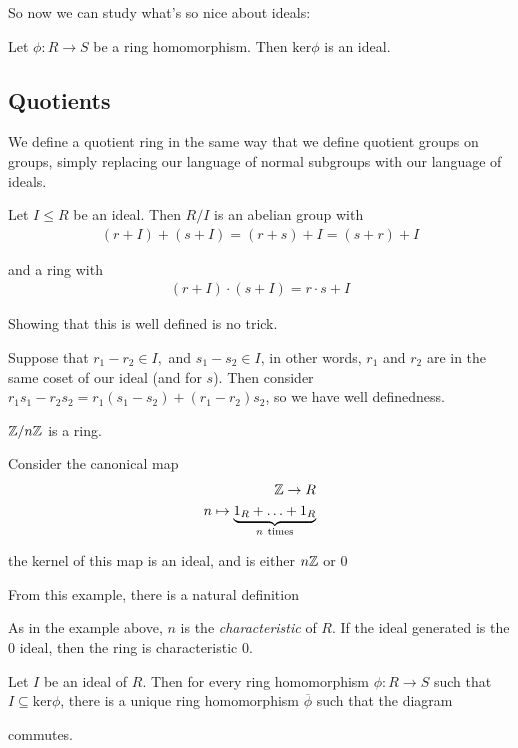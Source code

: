 \documentclass[12pt, twosided]{article}
\begin{document}
So now we can study what's so nice about ideals:

\begin{thm}
  Let \(\phi: R \to S\) be a ring homomorphism. Then \(\mathrm{ker} \phi\) is an ideal.
\end{thm}

\subsection{Quotients}

We define a quotient ring in the same way that we define quotient groups on groups, simply replacing our language of normal subgroups with our language of ideals.

\begin{df}
  Let \(I \leq R\) be an ideal. Then \(R / I\) is an abelian group with
  \begin{align*}
    (r + I) + (s + I) = (r + s) + I = (s + r) + I
  \end{align*}

  and a ring with
  \begin{align*}
    (r + I) \cdot (s + I) = r \cdot s + I
  \end{align*}
\end{df}

Showing that this is well defined is no trick.

Suppose that \(r_1 - r_2 \in I,\) and \(s_1 - s_2 \in I\), in other words, \(r_1\) and \(r_2\) are in the same coset of our ideal (and for \(s\)). Then consider \(r_1s_1 - r_2s_2 = r_1(s_1 - s_2) + (r_1 - r_2)s_2\), so we have well definedness.

\begin{exa}
  \(\mathbb{Z} / n\mathbb{Z}\) is a ring.

  Consider the canonical map
  \begin{align*}
    \mathbb{Z} \to R \\
    n \mapsto \underbrace{1_R + \ldots + 1_R}_{n\ \mathrm{times}}
  \end{align*}

  the kernel of this map is an ideal, and is either \(n\mathbb{Z}\) or 0
\end{exa}
From this example, there is a natural definition
\begin{df}
  As in the example above, \(n\) is the \textit{characteristic} of \(R\). If the ideal generated is the 0 ideal, then the ring is characteristic 0.
\end{df}

\begin{thm}
  Let \(I\) be an ideal of \(R\). Then for every ring homomorphism \(\phi: R \to S\) such that \(I \subseteq \mathrm{ker}\phi\), there is a unique ring homomorphism \(\overline{\phi}\) such that the diagram

  \begin{center}
  \end{center}
  commutes.
\end{thm}
\end{document}
